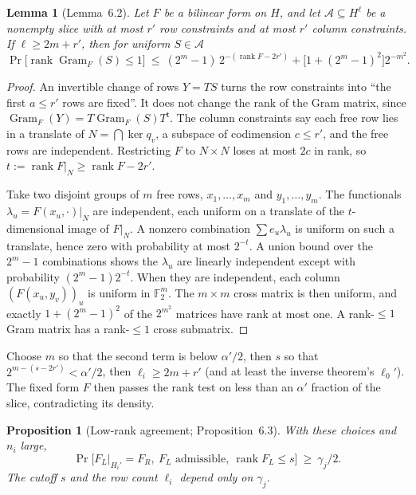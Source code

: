 \documentclass[11pt]{article}
\newtheorem{lemma}[theorem]{Lemma}
\newtheorem{proposition}[theorem]{Proposition}
\theoremstyle{definition}
\theoremstyle{remark}
\DeclareMathOperator{\rank}{rank}
\DeclareMathOperator{\Gram}{Gram}
\newcommand{\Fb}{\mathbb F_2}
\begin{document}
\begin{lemma}[Lemma~6.2]\label{lem:rank-slice}
Let $F$ be a bilinear form on $H$, and let $\mathcal A\subseteq H^\ell$ be a
nonempty slice with at most $r'$ row constraints and at most $r'$ column
constraints. If $\ell\ge2m+r'$, then for uniform $S\in\mathcal A$
\[
 \Pr\bigl[\rank\Gram_F(S)\le1\bigr]\ \le\
 (2^m-1)\,2^{-(\rank F-2r')}+\bigl[1+(2^m-1)^2\bigr]2^{-m^2}.
\]
\end{lemma}

\begin{proof}
An invertible change of rows $Y=TS$ turns the row constraints into ``the first
$a\le r'$ rows are fixed''. It does not change the rank of the Gram matrix,
since $\Gram_F(Y)=T\Gram_F(S)T^{\mathsf t}$. The column constraints say each
free row lies in a translate of $N=\bigcap\ker q_v$, a subspace of
codimension $c\le r'$, and the free rows are independent. Restricting $F$ to
$N\times N$ loses at most $2c$ in rank, so $t:=\rank F|_N\ge\rank F-2r'$.

Take two disjoint groups of $m$ free rows, $x_1,\ldots,x_m$ and
$y_1,\ldots,y_m$. The functionals $\lambda_u=F(x_u,\cdot)|_N$ are
independent, each uniform on a translate of the $t$-dimensional image of
$F|_N$. A nonzero combination $\sum e_u\lambda_u$ is uniform on such a
translate, hence zero with probability at most $2^{-t}$. A union bound over
the $2^m-1$ combinations shows the $\lambda_u$ are linearly independent
except with probability $(2^m-1)2^{-t}$. When they are independent, each
column $(F(x_u,y_v))_u$ is uniform in $\Fb^m$. The $m\times m$ cross matrix
is then uniform, and exactly $1+(2^m-1)^2$ of the $2^{m^2}$ matrices have rank
at most one. A rank-$\le1$ Gram matrix has a rank-$\le1$ cross submatrix.
\end{proof}

Choose $m$ so that the second term is below $\alpha'/2$, then $s$ so that
$2^{m-(s-2r')}<\alpha'/2$, then $\ell_i\ge 2m+r'$ (and at least the inverse
theorem's $\ell_0'$). The fixed form $F$ then passes the rank test on less
than an $\alpha'$ fraction of the slice, contradicting its density.

\begin{proposition}[Low-rank agreement; Proposition~6.3]\label{prop:low-rank}
With these choices and $n_i$ large,
\[
 \Pr\bigl[F_L|_{H_i'}=F_R,\ F_L\text{ admissible},\ \rank F_L\le s\bigr]
 \ \ge\ \gamma_j/2 .
\]
The cutoff $s$ and the row count $\ell_i$ depend only on $\gamma_j$.
\end{proposition}
\end{document}
